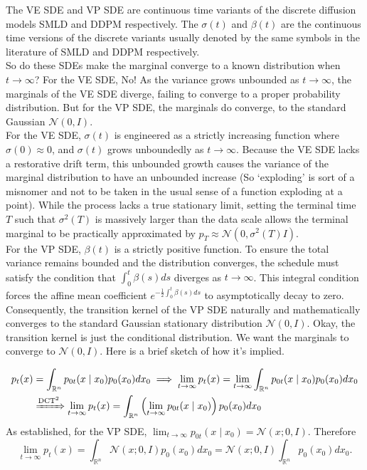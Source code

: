 \documentclass[11pt]{amsart}
\theoremstyle{plain}
\theoremstyle{definition}
\theoremstyle{remark}
\numberwithin{equation}{section}
\begin{document}
{The VE SDE and VP SDE are continuous time variants of the discrete diffusion models SMLD and DDPM respectively. The $\sigma(t)$ and $\beta(t)$ are the continuous time versions of the discrete variants usually denoted by the same symbols in the literature of SMLD and DDPM respectively.\\

So do these SDEs make the marginal converge to a known distribution when $t \to \infty$? For the VE SDE, No! As the variance grows unbounded as $t \to \infty$, the marginals of the VE SDE diverge, failing to converge to a proper probability distribution. But for the VP SDE, the marginals do converge, to the standard Gaussian $\mathcal{N}(0,I)$.\\

For the VE SDE, $\sigma(t)$ is engineered as a strictly increasing function where $\sigma(0) \approx 0$, and $\sigma(t)$ grows unboundedly as $t \to \infty$. 
Because the VE SDE lacks a restorative drift term, this unbounded growth causes the variance of the marginal distribution to have an unbounded increase (So `exploding' is sort of a misnomer and not to be taken in the usual sense of a function exploding at a point). 
While the process lacks a true stationary limit, setting the terminal time $T$ such that $\sigma^2(T)$ is massively larger than the data scale allows the terminal marginal to be practically approximated by $p_T \approx \mathcal{N}(0, \sigma^2(T)I)$.\\

For the VP SDE, $\beta(t)$ is a strictly positive function. 
To ensure the total variance remains bounded and the distribution converges, the schedule must satisfy the condition that $\int_0^t \beta(s)ds$ diverges as $t \to \infty$.
This integral condition forces the affine mean coefficient $e^{-\frac{1}{2}\int_0^t \beta(s)ds}$ to asymptotically decay to zero. Consequently, the transition kernel of the VP SDE naturally and mathematically converges to the standard Gaussian stationary distribution $\mathcal{N}(0, I)$. 
Okay, the transition kernel is just the conditional distribution. We want the marginals to converge to $\mathcal{N}(0, I)$. Here is a brief sketch of how it's implied.

\begin{align*}
p_t(x) &= \int_{\mathbb{R}^n} p_{0t}(x \mid x_0) p_0(x_0) dx_0 \implies \lim_{t \to \infty} p_t(x) = \lim_{t \to \infty} \int_{\mathbb{R}^n} p_{0t}(x \mid x_0) p_0(x_0) dx_0 \\
&\xRightarrow{\text{DCT\footnotemark}} \lim_{t \to \infty} p_t(x) = \int_{\mathbb{R}^n} \left( \lim_{t \to \infty} p_{0t}(x \mid x_0) \right) p_0(x_0) dx_0
\end{align*}
As established, for the VP SDE, $\lim_{t \to \infty} p_{0t}(x \mid x_0) = \mathcal{N}(x; 0, I)$. Therefore
$$ \lim_{t \to \infty} p_t(x) = \int_{\mathbb{R}^n} \mathcal{N}(x; 0, I) p_0(x_0) dx_0 =\mathcal{N}(x; 0, I) \int_{\mathbb{R}^n} p_0(x_0) dx_0. $$

}
\end{document}
